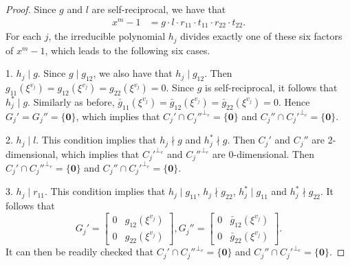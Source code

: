 \documentclass[a4paper,12pt]{article}
\begin{document}
\begin{proof} Since  $g$ and $l$ are self-reciprocal, we have that
\begin{align*}
x^m-1   &= g \cdot l \cdot r_{11} \cdot t_{11}     \cdot  r_{22} \cdot  t_{22}.
\end{align*}
For each $j$, the irreducible polynomial $h_j$ divides exactly one of these six factors of $x^m-1$, which leads to the following six cases.


1. $h_j \mid g$. Since $g \mid g_{12}$, we also have that $h_j \mid g_{12}$.  Then  
$g_{11}(\xi^{v_j})=g_{12}(\xi^{v_j})=g_{22}(\xi^{v_j})=0$. Since $g$ is self-reciprocal, it follows that $h_j^* \mid g$. Similarly as before,
$\bar{g}_{11}(\xi^{v_j})=\bar{g}_{12}(\xi^{v_j})=\bar{g}_{22}(\xi^{v_j})=0$.
Hence $G_j'=G_j''=\{\mathbf{0}\}$, which implies that  $C_j' \cap C_j''^{\perp_e} = \{\mathbf{0}\}$ and $C_j'' \cap C_j'^{\perp_e} = \{\mathbf{0}\}$.


2. $h_j \mid l$. This condition implies that $h_j \nmid g$ and $h_j^* \nmid g$. Then $C_j'$ and $C_j''$ are 2-dimensional, which implies that $C_j'^{\perp_e}$ and $C_j''^{\perp_e}$ are $0$-dimensional. Then $C_j' \cap C_j''^{\perp_e} = \{\mathbf{0}\}$ and $C_j'' \cap C_j'^{\perp_e} = \{\mathbf{0}\}$.

3. $h_j \mid r_{11}$. This condition implies that $h_j \mid g_{11}$, $h_j \nmid g_{22}$, $h_j^* \mid g_{11}$ and $h_j^* \nmid g_{22}$. It follows that  
$$
G_j'=   \begin{bmatrix}
0 & g_{12}(\xi^{v_j}) \\
0 & g_{22}(\xi^{v_j}) 
\end{bmatrix} ,
G_j''=   \begin{bmatrix}
0 & \bar{g}_{12}(\xi^{v_j}) \\
0 & \bar{g}_{22}(\xi^{v_j}) 
\end{bmatrix}.
$$
It can then be readily checked that $C_j' \cap C_j''^{\perp_e} = \{\mathbf{0}\}$ and $C_j'' \cap C_j'^{\perp_e} = \{\mathbf{0}\}$.


\end{proof}
\end{document}
